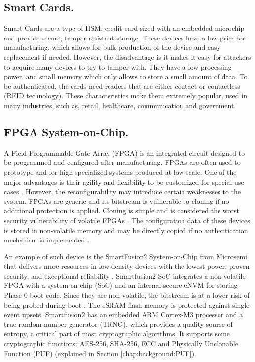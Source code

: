 \subsection*{Smart Cards.} \label{chap:background:computing:smartcards}
Smart Cards are a type of HSM, credit card-sized with an embedded microchip and provide secure, tamper-resistant storage. These devices have a low price for manufacturing, which allows for bulk production of the device and easy replacement if needed. However, the disadvantage is it makes it easy for attackers to acquire many devices to try to tamper with. They have a low processing power, and small memory which only allows to store a small amount of data. To be authenticated, the cards need readers that are either contact or contactless (RFID technology). These characteristics make them extremely popular, used in many industries, such as, retail, healthcare, communication and government.

\subsection {FPGA System-on-Chip.} \label{chap:background:computing:smartfusion}
A Field-Programmable Gate Array (FPGA) is an integrated circuit designed to be programmed and configured after manufacturing. FPGAs are often used to prototype and for high specialized systems produced at low scale. One of the major advantages is their agility and flexibility to be customized for special use cases \cite{cyberphysicalsystems}. However, the reconfigurability may introduce certain weaknesses to the system. FPGAs are generic and its bitstream is vulnerable to cloning if no additional protection is applied. Cloning is simple and is considered the worst security vulnerability of volatile FPGAs \cite{fpgasurvey}. The configuration data of these devices is stored in non-volatile memory and may be directly copied if no authentication mechanism is implemented \cite{drimer2007authentication}.

An example of such device is the SmartFusion2 System-on-Chip from Microsemi that delivers more resources in low-density devices with the lowest power, proven security, and exceptional reliability \cite{smartfusion2soc}. Smartfusion2 SoC integrates a non-volatile FPGA with a system-on-chip (SoC) and an internal secure eNVM for storing Phase 0 boot code. Since they are non-volatile, the bitstream is at a lower risk of being probed during boot \cite{parrinha2017flexible}. The eSRAM flash memory is protected against single event upsets. Smartfusion2 has an embedded ARM Cortex-M3 processor and a true random number generator (TRNG), which provides a quality source of entropy, a critical part of most cryptographic algorithms. It supports some cryptographic functions: AES-256, SHA-256, ECC and Physically Unclonable Function (PUF) (explained in Section \ref{chap:background:PUF}).


